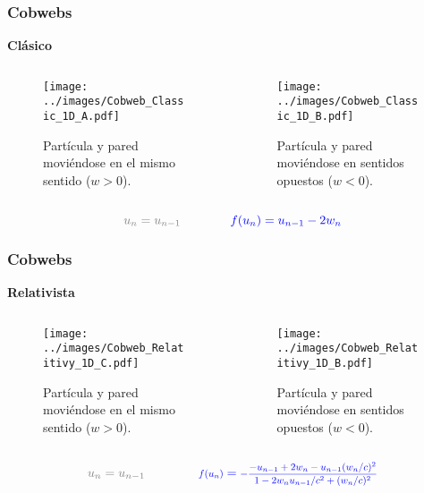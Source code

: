 \documentclass{beamer}
\begin{document}
\begin{frame}
    \frametitle[prueb1]{Cobwebs}{}
    \centering
    \textbf{Clásico}
    \begin{columns}
        \begin{column}{0.5\textwidth}
            \vspace{0.5cm}
            \begin{figure}
                \centering
                \texttt{[image: ../images/Cobweb\_Classic\_1D\_A.pdf]}
                \caption{Partícula y pared moviéndose en el mismo sentido ($w>0$).}
            \end{figure}  
        \end{column}
        \begin{column}{0.5\textwidth}
            \begin{figure}
                \centering
                \texttt{[image: ../images/Cobweb\_Classic\_1D\_B.pdf]}
                \caption{Partícula y pared moviéndose en sentidos opuestos ($w<0$).}
            \end{figure}  
        \end{column}
    \end{columns}
    \begin{equation*}
             \color{gray} u_n \color{gray} =  u_{n-1} \qquad\qquad \color{blue} f(u_n) \color{blue} =  u_{n-1} - 2w_n
    \end{equation*}
\end{frame}

\begin{frame}
    \frametitle[prueb1]{Cobwebs}{}
    \centering
    \textbf{Relativista}
    \begin{columns}
        \begin{column}{0.5\textwidth}
            \begin{figure}
                \centering
                \texttt{[image: ../images/Cobweb\_Relatitivy\_1D\_C.pdf]}
                \caption{Partícula y pared moviéndose en el mismo sentido  ($w>0$).}
            \end{figure}  
        \end{column}
        \begin{column}{0.5\textwidth}
            \begin{figure}
                \centering
                \texttt{[image: ../images/Cobweb\_Relatitivy\_1D\_B.pdf]}
                \caption{Partícula y pared moviéndose en sentidos opuestos ($w<0$).}
            \end{figure}  
        \end{column}
    \end{columns}
    \begin{equation*}
        \color{gray} u_n \color{gray} =  u_{n-1} \qquad\qquad \color{blue} \scalebox{0.8}{ $f(u_n)$} \color{blue} = \scalebox{0.8}{$-\dfrac{-u_{n-1} + 2w_n - u_{n-1}(w_n/c)^2}{1 - 2w_n u_{n-1}/c^2 + (w_n/c)^2}$}
    \end{equation*}
\end{frame}
\end{document}
